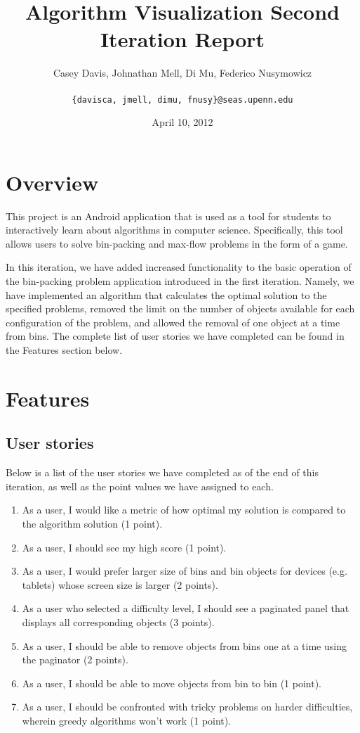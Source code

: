 \documentclass[11pt]{article}
\title{Algorithm Visualization Second Iteration Report}
\author{Casey Davis, Johnathan Mell, Di Mu, Federico Nusymowicz \\\\
\texttt{\{davisca, jmell, dimu, fnusy\}@seas.upenn.edu}}
\date{April 10, 2012}
\begin{document}
\maketitle

\section{Overview}

This project is an Android application that is used as a tool for students to
interactively learn about algorithms in computer science.  Specifically, this
tool allows users to solve bin-packing and max-flow problems in the form of a
game.

In this iteration, we have added increased functionality to the basic operation
of the bin-packing problem application introduced in the first iteration.
Namely, we have implemented an algorithm that calculates the optimal solution
to the specified problems, removed the limit on the number of objects available
for each configuration of the problem, and allowed the removal of one object
at a time from bins.  The complete list of user stories we have completed can
be found in the Features section below.

\section{Features}

\subsection{User stories}

Below is a list of the user stories we have completed as of the end of this
iteration, as well as the point values we have assigned to each.

\begin{enumerate}

\item As a user, I would like a metric of how optimal my solution is compared to
the algorithm solution (1 point).
\item As a user, I should see my high score (1 point).
\item As a user, I would prefer larger size of bins and bin objects for devices
(e.g. tablets) whose screen size is larger (2 points).
\item As a user who selected a difficulty level, I should see a paginated panel
that displays all corresponding objects (3 points).
\item As a user, I should be able to remove objects from bins one at a time
using the paginator (2 points).
\item As a user, I should be able to move objects from bin to bin (1 point).
\item As a user, I should be confronted with tricky problems on harder
difficulties, wherein greedy algorithms won't work (1 point).

\end{enumerate}
\end{document}
